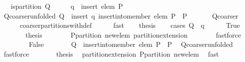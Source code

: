 \begin{isabellebody}
\ \ \ {\isachardoublequoteopen}is{\isacharunderscore}partition\ Q{\isachardoublequoteclose}\isanewline
%
\isadelimproof
%
\endisadelimproof
%
\isatagproof
{}\isamarkupfalse%
\ {\isacharminus}\isanewline
\ \ \isamarkupfalse%
\ {\isacharquery}q\ {\isacharequal}\ {\isachardoublequoteopen}insert\ {\isacharbraceleft}elem{\isacharbraceright}\ P{\isachardoublequoteclose}\isanewline
\ \ \isamarkupfalse%
\ Q{\isacharunderscore}coarser{\isacharunderscore}unfolded{\isacharcolon}\ {\isachardoublequoteopen}Q\ {\isasymin}\ insert\ {\isacharquery}q\ {\isacharparenleft}insert{\isacharunderscore}into{\isacharunderscore}member\ elem\ P\ {\isacharbackquote}\ P{\isacharparenright}{\isachardoublequoteclose}\ \isanewline
\ \ \ \ \isamarkupfalse%
\ Q{\isacharunderscore}coarser\ \isanewline
\ \ \ \ \isamarkupfalse%
\ coarser{\isacharunderscore}partitions{\isacharunderscore}with{\isacharunderscore}def\isanewline
\ \ \ \ \isamarkupfalse%
\ fast\isanewline
\ \ \isamarkupfalse%
\ {\isacharquery}thesis\isanewline
\ \ \isamarkupfalse%
\ {\isacharparenleft}cases\ {\isachardoublequoteopen}Q\ {\isacharequal}\ {\isacharquery}q{\isachardoublequoteclose}{\isacharparenright}\isanewline
\ \ \ \ \isamarkupfalse%
\ True\isanewline
\ \ \ \ \isamarkupfalse%
\ \isamarkupfalse%
\ {\isacharquery}thesis\isanewline
\ \ \ \ \ \ \isamarkupfalse%
\ P{\isacharunderscore}partition\ new{\isacharunderscore}elem\ partition{\isacharunderscore}extension{}\isanewline
\ \ \ \ \ \ \isamarkupfalse%
\ fastforce\isanewline
\ \ \isamarkupfalse%
\isanewline
\ \ \ \ \isamarkupfalse%
\ False\isanewline
\ \ \ \ \isamarkupfalse%
\ \isamarkupfalse%
\ {\isachardoublequoteopen}Q\ {\isasymin}\ {\isacharparenleft}insert{\isacharunderscore}into{\isacharunderscore}member\ elem\ P{\isacharparenright}\ {\isacharbackquote}\ P{\isachardoublequoteclose}\ \isamarkupfalse%
\ Q{\isacharunderscore}coarser{\isacharunderscore}unfolded\ \isamarkupfalse%
\ fastforce\isanewline
\ \ \ \ \isamarkupfalse%
\ \isamarkupfalse%
\ {\isacharquery}thesis\ \isamarkupfalse%
\ partition{\isacharunderscore}extension{}\ P{\isacharunderscore}partition\ new{\isacharunderscore}elem\ \isamarkupfalse%
\ fast\isanewline
\ \ \isamarkupfalse%

\end{isabellebody}
